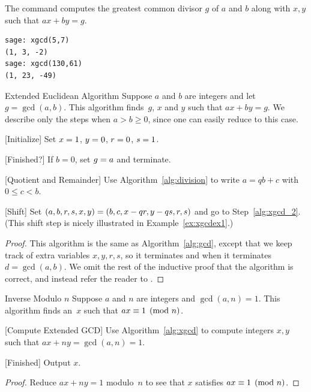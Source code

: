 \begin{sg}
The  command computes the greatest common
divisor $g$ of $a$ and $b$ along with $x,y$ such that $ax + by = g$.
\begin{verbatim}
sage: xgcd(5,7)
(1, 3, -2)
sage: xgcd(130,61)
(1, 23, -49)
\end{verbatim}
\end{sg}

\begin{algorithm}{Extended Euclidean Algorithm}\label{alg:xgcd}
Suppose $a$ and $b$ are integers and let $g=\gcd(a,b)$.
This algorithm finds~$g$, $x$ and $y$ such that $ax+by = g$.
We describe only the steps when $a>b\geq 0$, since one
can easily reduce to this case.
\begin{steps}
\item{} [Initialize] Set $x= 1$, $y= 0$, $r = 0$, $s = 1$.
\item{} [Finished?] \label{alg:xgcd_2} If $b=0$, set $g= a$ and terminate.
\item{} [Quotient and Remainder]
Use Algorithm~\ref{alg:division} to write $a = qb + c$ with $0\leq c<b$.
\item{} [Shift]
Set $(a, b, r, s, x, y) = (b, c, x-qr, y-qs, r, s)$
and go to Step~\ref{alg:xgcd_2}.
(This shift step is nicely illustrated in Example~\ref{ex:xgcdex1}.)
\end{steps}
\end{algorithm}
\begin{proof}
This algorithm is the same as Algorithm~\ref{alg:gcd}, except that we
keep track of extra variables $x,y,r,s$, so it terminates and when
it terminates $d=\gcd(a,b)$.
We omit the rest of the inductive proof that the algorithm
is correct, and instead refer the  reader to
\cite[\S1.2.1]{knuth1}.
\end{proof}

\begin{algorithm}{Inverse Modulo $n$}\label{alg:inversemod}
Suppose $a$ and $n$ are integers and $\gcd(a,n)=1$.
This algorithm finds an~$x$ such that $ax\equiv 1\pmod{n}$.
\begin{steps}
\item{} [Compute Extended GCD] Use Algorithm~\ref{alg:xgcd} to compute
integers $x,y$ such that $ax+ny=\gcd(a,n)=1$.
\item{} [Finished] Output $x$.
\end{steps}
\end{algorithm}
\begin{proof}
Reduce $ax+ny=1$ modulo~$n$ to see that $x$
satisfies $ax\equiv 1\pmod{n}$.
\end{proof}

